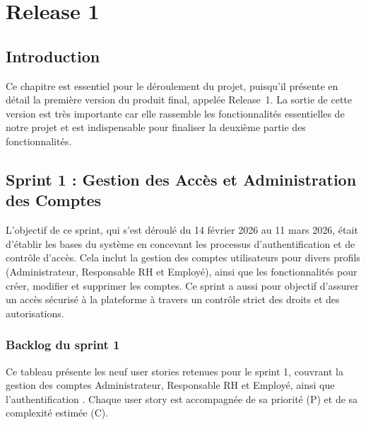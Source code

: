 \chapter{Release 1}
\setlength{\intextsep}{8pt}
\setlength{\textfloatsep}{10pt}
\setlength{\floatsep}{8pt}
\setlength{\abovecaptionskip}{4pt}
\setlength{\belowcaptionskip}{2pt}
\setlength{\LTpre}{6pt}
\setlength{\LTpost}{6pt}




\newpage

\section{Introduction}

Ce chapitre est essentiel pour le déroulement du projet, puisqu'il présente en détail la première version du produit final, appelée Release~1. La sortie de cette version est très importante car elle rassemble les fonctionnalités essentielles de notre projet et est indispensable pour finaliser la deuxième partie des fonctionnalités.

\section{Sprint 1 : Gestion des Accès et Administration des Comptes}

L'objectif de ce sprint, qui s'est déroulé du 14 février 2026 au 11 mars 2026, était d'établir les bases du système en concevant les processus d'authentification et de contrôle d'accès. Cela inclut la gestion des comptes utilisateurs pour divers profils (Administrateur, Responsable RH et Employé), ainsi que les fonctionnalités pour créer, modifier et supprimer les comptes. Ce sprint a aussi pour objectif d'assurer un accès sécurisé à la plateforme à travers un contrôle strict des droits et des autorisations.

\subsection{Backlog du sprint 1}
Ce tableau présente les neuf user stories retenues pour le sprint 1, couvrant la gestion des comptes Administrateur, Responsable RH et Employé, ainsi que l'authentification . Chaque user story est accompagnée de sa priorité (P) et de sa complexité estimée (C).

